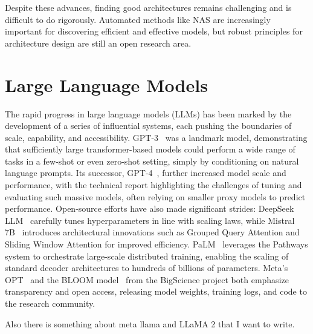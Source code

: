 Despite these advances, finding good architectures remains challenging and is difficult to do rigorously. Automated methods like NAS are increasingly important for discovering efficient and effective models, but robust principles for architecture design are still an open research area.

\section{Large Language Models}

The rapid progress in large language models (LLMs) has been marked by the development of a series of influential systems, each pushing the boundaries of scale, capability, and accessibility. GPT-3~\citep{brown2020gpt3} was a landmark model, demonstrating that sufficiently large transformer-based models could perform a wide range of tasks in a few-shot or even zero-shot setting, simply by conditioning on natural language prompts. Its successor, GPT-4~\citep{openai2023gpt4}, further increased model scale and performance, with the technical report highlighting the challenges of tuning and evaluating such massive models, often relying on smaller proxy models to predict performance. Open-source efforts have also made significant strides: DeepSeek LLM~\citep{deepseek2024llm} carefully tunes hyperparameters in line with scaling laws, while Mistral 7B~\citep{jiang2023mistral} introduces architectural innovations such as Grouped Query Attention and Sliding Window Attention for improved efficiency. PaLM~\citep{chowdhery2023palm} leverages the Pathways system to orchestrate large-scale distributed training, enabling the scaling of standard decoder architectures to hundreds of billions of parameters. Meta's OPT~\citep{zhang2022opt} and the BLOOM model~\citep{le2023bloom} from the BigScience project both emphasize transparency and open access, releasing model weights, training logs, and code to the research community.

Also there is something about meta llama \citep{touvron2023llama} and LLaMA 2 \citep{touvron2023llama2} that I want to write.



